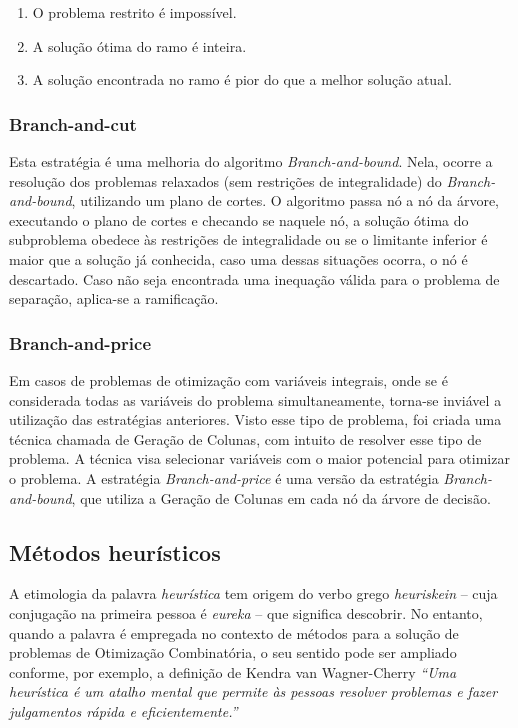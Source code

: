 \begin{enumerate}
    \item O problema restrito é impossível.
    \item A solução ótima do ramo é inteira.
    \item A solução encontrada no ramo é pior do que a melhor solução atual.
\end{enumerate}

\subsubsection{Branch-and-cut}
Esta estratégia é uma melhoria do algoritmo \emph{Branch-and-bound}. Nela, ocorre a resolução dos problemas relaxados (sem restrições de integralidade) do \emph{Branch-and-bound}, utilizando um plano de cortes. O algoritmo passa nó a nó da árvore, executando o plano de cortes e checando se naquele nó, a solução ótima do subproblema obedece às restrições de integralidade ou se o limitante inferior é maior que a solução já conhecida, caso uma dessas situações ocorra, o nó é descartado. Caso não seja encontrada uma inequação válida para o problema de separação, aplica-se a ramificação.


\subsubsection{Branch-and-price}
Em casos de problemas de otimização com variáveis integrais, onde se é considerada todas as variáveis do problema simultaneamente, torna-se inviável a utilização das estratégias anteriores. Visto esse tipo de problema, foi criada uma técnica chamada de Geração de Colunas, com intuito de resolver esse tipo de problema. A técnica visa selecionar variáveis com o maior potencial para otimizar o problema. A estratégia \emph{Branch-and-price} é uma versão da estratégia \emph{Branch-and-bound}, que utiliza a Geração de Colunas  em cada nó da árvore de decisão.

\subsection{Métodos heurísticos}\label{heuristica}
A etimologia da palavra \emph{heurística} tem origem do verbo grego \emph{heuriskein} -- cuja conjugação na primeira pessoa é \emph{eureka} -- que significa descobrir. No entanto, quando a palavra é empregada no contexto de métodos para a solução de problemas de Otimização Combinatória, o seu sentido pode ser ampliado conforme, por exemplo, a definição de Kendra van Wagner-Cherry \emph{``Uma heurística é um atalho mental que permite às pessoas resolver problemas e fazer julgamentos rápida e eficientemente.''} \cite{goldbarg}


